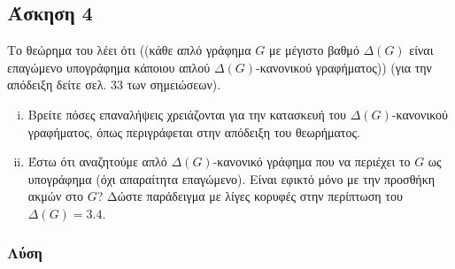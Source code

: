 \newpage\subsection*{Άσκηση 4}

Το θεώρημα του  λέει ότι ((κάθε απλό γράφημα $G$ με μέγιστο βαθμό $\Delta(G)$ είναι 
επαγώμενο υπογράφημα κάποιου απλού $\Delta(G)$-κανονικού γραφήματος)) (για την απόδειξη 
δείτε σελ. 33 των σημειώσεων).

\begin{enumerate}[i.]
\item
Βρείτε πόσες επαναλήψεις χρειάζονται για την κατασκευή του $\Delta(G)$-κανονικού γραφήματος,
όπως περιγράφεται στην απόδειξη του θεωρήματος.

\item
Έστω ότι αναζητούμε απλό $\Delta(G)$-κανονικό γράφημα που να περιέχει το $G$ ως υπογράφημα 
(όχι απαραίτητα επαγώμενο). Είναι εφικτό μόνο με την προσθήκη ακμών στο $G$? Δώστε παράδειγμα 
με λίγες κορυφές στην περίπτωση του $\Delta(G)=3.4$.

\end{enumerate}

\subsubsection*{Λύση}

